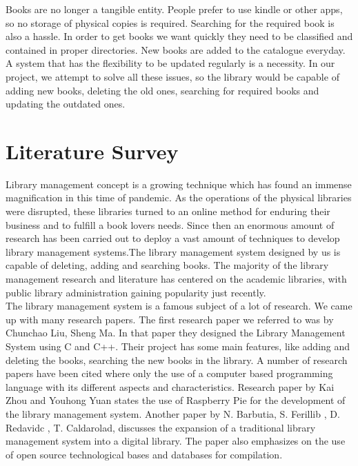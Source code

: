 \documentclass[conference]{IEEEtran}
\begin{document}
Books are no longer a tangible entity. People prefer to use kindle or
other apps, so no storage of physical copies is required. Searching for
the required book is also a hassle. In order to get books we want quickly
they need to be classified and contained in proper directories. New books
are added to the catalogue everyday. A system that has the flexibility to
be updated regularly is a necessity. In our project, we attempt to solve
all these issues, so the library would be capable of adding new books,
deleting the old ones, searching for required books and updating the
outdated ones.

\section{Literature Survey}
Library management concept is a growing technique which has found an 
immense magnification in this time of pandemic. As the operations of the 
physical libraries were disrupted, these libraries turned to an online 
method for enduring their business and to fulfill a book lovers needs. 
Since then an enormous amount of research has been carried out to deploy 
a vast amount of techniques to develop library management systems.The 
library management system designed by us is capable of deleting, adding 
and searching books. The majority of the library management research and 
literature has centered on the academic libraries, with public library 
administration gaining popularity just recently.\\

The library management system is a famous subject of a lot of research. 
We came up with many research papers. 
The first research paper we referred to was by Chunchao Liu, Sheng Ma. 
In that paper they designed the Library Management System using C and C++. 
Their project has some  main features, like adding and deleting the books, 
searching the new books in the library.\cite{[1]}
 A number of research papers have been cited where only the use of a 
 computer based programming language with its different aspects and 
 characteristics. Research paper by Kai Zhou and Youhong Yuan states the 
 use of Raspberry Pie for the development of the library management system\cite{[2]}. 
 Another paper by N. Barbutia, S. Ferillib , D. Redavidc , T. Caldarolad, 
 discusses the expansion of a traditional library management system into a 
 digital library. The paper also emphasizes on the use of open source 
 technological bases and databases for compilation\cite{[3]}.\\
\end{document}
